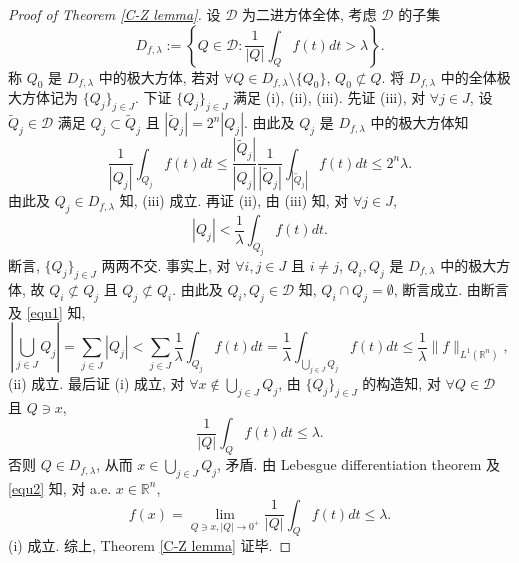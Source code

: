 \documentclass[a4paper,11pt]{article}
\theoremstyle{definition}
\begin{document}
\begin{proof}[Proof of Theorem \ref{C-Z lemma}]
    设 $ \mathcal{D} $ 为二进方体全体, 考虑 $ \mathcal{D} $ 的子集
    $$
        D_{f, \lambda} := \left\{ Q \in \mathcal{D} : \frac{1}{|Q|} \int_{Q} f(t) dt > \lambda \right\}.
    $$
    称 $ Q_0 $ 是 $ D_{f, \lambda} $ 中的极大方体, 若对 $ \forall Q \in D_{f, \lambda} \setminus \{Q_0\} $, 
    $ Q_0 \not\subset Q $. 将 $ D_{f, \lambda} $ 中的全体极大方体记为 $ \{Q_j\}_{j \in J} $. 
    下证 $ \{Q_j\}_{j \in J} $ 满足 (i), (ii), (iii). 
    先证 (iii),
    对 $ \forall j \in J $, 设 $ \widetilde{Q}_j \in \mathcal{D} $ 满足 $ Q_j \subset \widetilde{Q}_j $
    且 $ |\widetilde{Q}_j| = 2^n |Q_j| $. 由此及 $ Q_j $ 是 $ D_{f, \lambda} $ 中的极大方体知
    $$
        \frac{1}{|Q_j|} \int_{Q_j} f(t) dt 
            \leq \frac{|\widetilde{Q}_j|}{|Q_j|} \frac{1}{|\widetilde{Q}_j|} \int_{|\widetilde{Q}_j|} f(t) dt 
            \leq 2^n \lambda.
    $$
    由此及 $ Q_j \in D_{f, \lambda} $ 知, (iii) 成立. 
    再证 (ii), 
    由 (iii) 知, 对 $ \forall j \in J $, 
    \begin{equation} \label{equ1}
        |Q_j| < \frac{1}{\lambda} \int_{Q_j} f(t) dt.
    \end{equation}
    断言, $ \{Q_j\}_{j \in J} $ 两两不交. 事实上, 对 $ \forall i, j \in J $ 且 $ i \neq j $, 
    $ Q_i, Q_j $ 是 $ D_{f, \lambda} $ 中的极大方体, 故 $ Q_i \not\subset Q_j $ 且 $ Q_j \not\subset Q_i $.
    由此及 $ Q_i, Q_j \in \mathcal{D} $ 知, $ Q_i \cap Q_j = \emptyset $, 断言成立. 
    由断言及 \eqref{equ1} 知,
    $$
         \left| \bigcup_{j \in J} Q_j \right| 
            =  \sum_{j \in J} |Q_j|
            < \sum_{j \in J} \frac{1}{\lambda} \int_{Q_j} f(t) dt
            =\frac{1}{\lambda} \int_{\bigcup_{j \in J} Q_j} f(t) dt
            \leq \frac{1}{\lambda} \| f \|_{L^1(\mathbb{R}^n)},
    $$
    (ii) 成立. 最后证 (i) 成立, 对 $ \forall x \notin \bigcup_{j \in J} Q_j $,
    由 $ \{Q_j\}_{j \in J} $ 的构造知, 对 $ \forall Q \in \mathcal{D} $ 且 $ Q \ni x $, 
    \begin{equation} \label{equ2}
        \frac{1}{|Q|} \int_{Q} f(t) dt \leq \lambda.
    \end{equation}
    否则 $ Q \in D_{f, \lambda}$, 从而 $ x \in \bigcup_{j \in J} Q_j $, 矛盾.
    由 Lebesgue differentiation theorem 及 \eqref{equ2} 知, 对 a.e. $ x \in \mathbb{R}^n $,
    $$
        f(x) = \lim_{Q \ni x, |Q| \to 0^+} \frac{1}{|Q|} \int_{Q} f(t) dt \leq \lambda.
    $$
    (i) 成立. 综上, Theorem \ref{C-Z lemma} 证毕.
\end{proof}
\end{document}
